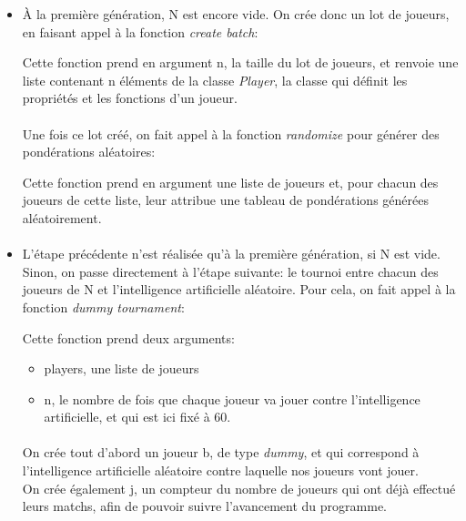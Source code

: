 \documentclass[10pt, french]{article}
\begin{document}
\begin{itemize}
\paragraph{}
\item À la première génération, N est encore vide. On crée donc un lot de joueurs, en faisant appel à la fonction \textit{create batch}: 

Cette fonction prend en argument n, la taille du lot de joueurs, et renvoie une liste contenant n éléments de la classe \textit{Player}, la classe qui définit les propriétés et les fonctions d'un joueur. 

\paragraph{}
 Une fois ce lot créé, on fait appel à la fonction \textit{randomize} pour générer des pondérations aléatoires: 

Cette fonction prend en argument une liste de joueurs et, pour chacun des joueurs de cette liste, leur attribue une tableau de pondérations générées aléatoirement. 

\paragraph{}
\item L'étape précédente n'est réalisée qu'à la première génération, si N est vide. Sinon, on passe directement à l'étape suivante: le tournoi entre chacun des joueurs de N et l'intelligence artificielle aléatoire. 
Pour cela, on fait appel à la fonction \textit{dummy tournament}: 


Cette fonction prend deux arguments: 
\begin{itemize}
    \item players, une liste de joueurs
    \item n, le nombre de fois que chaque joueur va jouer contre l'intelligence artificielle, et qui est ici fixé à 60. 
\end{itemize}
\paragraph{}
On crée tout d'abord un joueur b, de type \textit{dummy}, et qui correspond à l'intelligence artificielle aléatoire contre laquelle nos joueurs vont jouer.\\
On crée également j, un compteur du nombre de joueurs qui ont déjà effectué leurs matchs, afin de pouvoir suivre l'avancement du programme. 

\end{itemize}
\end{document}
